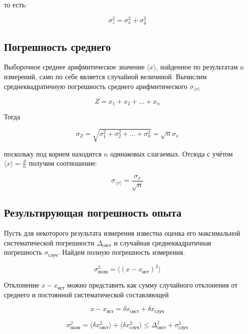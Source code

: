 \documentclass[12pt]{article}
\begin{document}
      то есть:

      \begin{equation}
        \sigma_z^2 = \sigma_x^2 + \sigma_y^2
      \end{equation}

    \subsection{Погрешность среднего}

      Выборочное среднее арифмитическое значение $\langle x \rangle$, найденное по
      результатам n измерений, само по себе является случайной величиной. Вычислим
      среднеквадратичную погрешность среднего арифмитического $\sigma_{\langle x \rangle}$

      $$
        Z = x_1 + x_2 + ... + x_n
      $$

      Тогда

      $$
        \sigma_Z = \sqrt{\sigma_1^2 + \sigma_2^2 + ... + \sigma_n^2} = \sqrt{n} \sigma_x
      $$

      поскольку под корнем находится $n$ одинаковых слагаемых. Отсюда с учётом
      $\langle x \rangle = \frac{Z}{n}$ получим соотношение:

      \begin{equation}
        \sigma_{\langle x \rangle} = \frac{\sigma_x}{\sqrt{n}}
      \end{equation}

    \subsection{Результирующая погрешность опыта}

      Пусть для некоторого результата измерения известна оценка его максимальной
      систематической погрешности $\Delta_{сист}$ и случайная среднеквадратичная
      погрешность $\sigma_{случ}$. Найдем полную погрешность измерения.

      $$
        \sigma_{полн}^2 = \langle (x - x_{ист})^2 \rangle
      $$

      Отклонение $x - x_{ист}$ можно представить как сумму случайного отклонения
      от среднего и постоянной систематической составляющей

      $$
        x - x_{ист} = \delta x_{сист} + \delta x_{случ}
      $$

      \begin{equation}
        \sigma_{полн}^2 = \langle \delta x_{сист}^2 \rangle + \langle \delta x_{случ}^2 \rangle
        \leqslant \Delta_{сист}^2 + \sigma_{случ}^2
      \end{equation}
\end{document}
